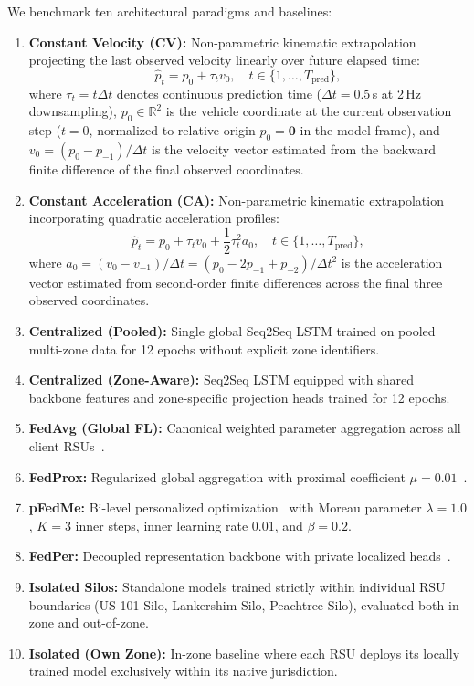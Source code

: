 \documentclass[journal]{IEEEtran}
\begin{document}
We benchmark ten architectural paradigms and baselines:
\begin{enumerate}
    \item \textbf{Constant Velocity (CV):} Non-parametric kinematic extrapolation projecting the last observed velocity linearly over future elapsed time:
    \begin{equation}
    \hat{p}_t = p_0 + \tau_t v_0, \quad t \in \{1, \dots, T_{\mathrm{pred}}\},
    \label{eq:cv_baseline}
    \end{equation}
    where $\tau_t = t \Delta t$ denotes continuous prediction time ($\Delta t = 0.5$\,s at 2\,Hz downsampling), $p_0 \in \mathbb{R}^2$ is the vehicle coordinate at the current observation step ($t=0$, normalized to relative origin $p_0 = \mathbf{0}$ in the model frame), and $v_0 = (p_0 - p_{-1})/\Delta t$ is the velocity vector estimated from the backward finite difference of the final observed coordinates.
    \item \textbf{Constant Acceleration (CA):} Non-parametric kinematic extrapolation incorporating quadratic acceleration profiles:
    \begin{equation}
    \hat{p}_t = p_0 + \tau_t v_0 + \frac{1}{2} \tau_t^2 a_0, \quad t \in \{1, \dots, T_{\mathrm{pred}}\},
    \label{eq:ca_baseline}
    \end{equation}
    where $a_0 = (v_0 - v_{-1})/\Delta t = (p_0 - 2p_{-1} + p_{-2})/\Delta t^2$ is the acceleration vector estimated from second-order finite differences across the final three observed coordinates.
    \item \textbf{Centralized (Pooled):} Single global Seq2Seq LSTM trained on pooled multi-zone data for 12 epochs without explicit zone identifiers.
    \item \textbf{Centralized (Zone-Aware):} Seq2Seq LSTM equipped with shared backbone features and zone-specific projection heads trained for 12 epochs.
    \item \textbf{FedAvg (Global FL):} Canonical weighted parameter aggregation across all client RSUs~\cite{mcmahan2017communication}.
    \item \textbf{FedProx:} Regularized global aggregation with proximal coefficient $\mu = 0.01$~\cite{li2020federated}.
    \item \textbf{pFedMe:} Bi-level personalized optimization~\cite{dinh2020personalized} with Moreau parameter $\lambda = 1.0$, $K = 3$ inner steps, inner learning rate 0.01, and $\beta = 0.2$.
    \item \textbf{FedPer:} Decoupled representation backbone with private localized heads~\cite{arivazhagan2019federated}.
    \item \textbf{Isolated Silos:} Standalone models trained strictly within individual RSU boundaries (US-101 Silo, Lankershim Silo, Peachtree Silo), evaluated both in-zone and out-of-zone.
    \item \textbf{Isolated (Own Zone):} In-zone baseline where each RSU deploys its locally trained model exclusively within its native jurisdiction.
\end{enumerate}
\end{document}
